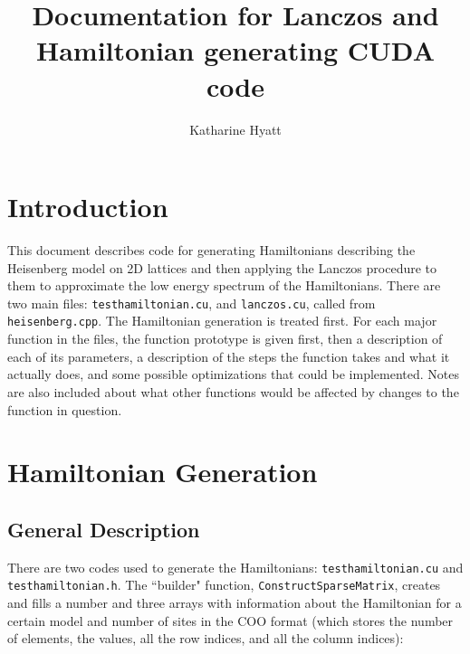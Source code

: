 \documentclass{article}
\author{Katharine Hyatt}
\title{Documentation for Lanczos and Hamiltonian generating CUDA code}
\begin{document}
\renewcommand{\int}{\textcolor{Green}{int $\,$}}
\newcommand{\ptrint}{\textcolor{Green}{int $^\ast \,$}}
\newcommand{\const}{\textcolor{Green}{const $\,$}}
\newcommand{\double}{\textcolor{Green}{double $\,$}}
\newcommand{\void}{\textcolor{Green}{void $\,$}}
\newcommand{\typeinttwoptr}{\textcolor{Green}{int2$^\ast \,$}}
\newcommand{\cuDoubleComplex}{\textcolor{Green}{cuDoubleComplex$^\ast \,$}}
\newcommand{\hamstruct}{\textcolor{Green}{hamstruct$^\ast \,$}}
\newcommand{\host}{\textcolor{Red}{$\_\_$host$\_\_ \; \;$}}
\newcommand{\cudaglobal}{\textcolor{Red}{$\_\_$global$\_\_ \; \;$}}
\newcommand{\device}{\textcolor{Red}{$\_\_$device$\_\_ \; \;$}}

\begin{titlepage}
\maketitle
\end{titlepage}

\section{Introduction}

This document describes code for generating Hamiltonians describing the Heisenberg model on 2D lattices and then applying the Lanczos procedure to them to approximate the low energy spectrum of the Hamiltonians. 
There are two main files: \texttt{testhamiltonian.cu}, and \texttt{lanczos.cu}, called from \texttt{heisenberg.cpp}. The Hamiltonian generation is treated first. 
For each major function in the files, the function prototype is given first, then a description of each of its parameters, a description of the steps the function takes and what it actually does, and some possible optimizations that could be implemented. 
Notes are also included about what other functions would be affected by changes to the function in question.

\section{Hamiltonian Generation}

\subsection{General Description}

There are two codes used to generate the Hamiltonians: \texttt{testhamiltonian.cu} and \texttt{testhamiltonian.h}. 
The ``builder" function, \texttt{ConstructSparseMatrix}, creates and fills a number and three arrays with information about the Hamiltonian for a certain model and number of sites in the COO format (which stores the number of elements, the values, all the row indices, and all the column indices):
\end{document}
